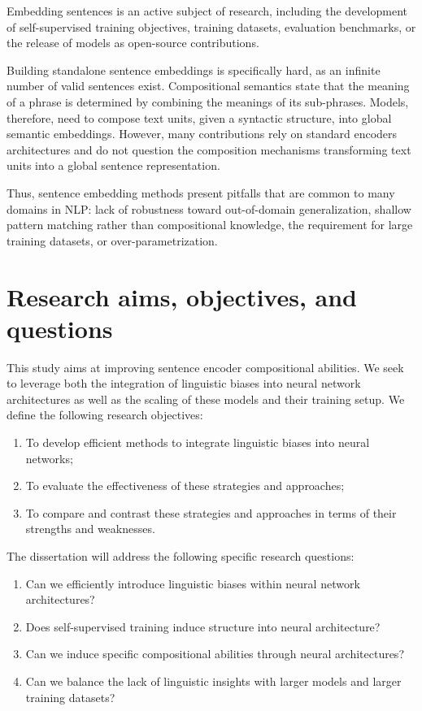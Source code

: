 Embedding sentences is an active subject of research, including the development of self-supervised training objectives, training datasets, evaluation benchmarks, or the release of models as open-source contributions.

Building standalone sentence embeddings is specifically hard, as an infinite number of valid sentences exist. Compositional semantics state that the meaning of a phrase is determined by combining the meanings of its sub-phrases. Models, therefore, need to compose text units, given a syntactic structure, into global semantic embeddings. However, many contributions rely on standard encoders architectures and do not question the composition mechanisms transforming text units into a global sentence representation.

Thus, sentence embedding methods present pitfalls that are common to many domains in NLP: lack of robustness toward out-of-domain generalization, shallow pattern matching rather than compositional knowledge, the requirement for large training datasets, or over-parametrization. 

\section{Research aims, objectives, and questions}

This study aims at improving sentence encoder compositional abilities. We seek to leverage both the integration of linguistic biases into neural network architectures as well as the scaling of these models and their training setup.
We define the following research objectives:

\begin{enumerate}
    \item To develop efficient methods to integrate linguistic biases into neural networks;
    \item To evaluate the effectiveness of these strategies and approaches;
    \item To compare and contrast these strategies and approaches in terms of their strengths and weaknesses.
\end{enumerate}

 The dissertation will address the following specific research questions:
\begin{enumerate}
    \item Can we efficiently introduce linguistic biases within neural network architectures? 
    \item Does self-supervised training induce structure into neural architecture?
    \item Can we induce specific compositional abilities through neural architectures?
    \item Can we balance the lack of linguistic insights with larger models and larger training datasets?
\end{enumerate}

